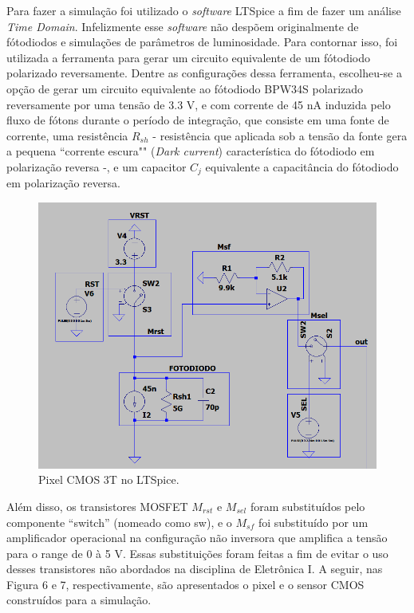 \documentclass[10pt,a4paper,twocolumn]{article}
\begin{document}
	Para fazer a simulação foi utilizado o \textit{software} LTSpice a fim de fazer um análise \textit{Time Domain}. Infelizmente esse \textit{software} não despõem originalmente de fótodiodos e simulações de parâmetros de luminosidade. Para contornar isso, foi utilizada a ferramenta \cite{photodiode} para gerar um circuito equivalente de um fótodiodo polarizado reversamente. Dentre as configurações dessa ferramenta, escolheu-se a opção de gerar um circuito equivalente ao fótodiodo BPW34S \cite{BPW34} polarizado reversamente por uma tensão de 3.3 V, e com corrente de 45 nA induzida pelo fluxo de fótons durante o período de integração, que consiste em uma fonte de corrente, uma resistência $R_{sh}$ - resistência que aplicada sob a tensão da fonte gera a pequena ``corrente escura"" (\textit{Dark current}) característica do fótodiodo em polarização reversa -, e um capacitor $C_{j}$ equivalente a capacitância do fótodiodo em polarização reversa.
	
	\begin{figure}[H]
		\centering
		\includegraphics[scale=0.26]{imagens/pixel_simulado.png}
		\caption{Pixel CMOS 3T no LTSpice.}
	\end{figure}
	
	Além disso, os transistores MOSFET $M_{rst}$ e $M_{sel}$ foram substituídos pelo componente ``switch'' (nomeado como sw), e o $M_{sf}$ foi substituído por um amplificador operacional na configuração não inversora que amplifica a tensão para o range de 0 à 5 V. Essas substituições foram feitas a fim de evitar o uso desses transistores não abordados na disciplina de Eletrônica I. A seguir, nas Figura 6 e 7, respectivamente, são apresentados o pixel e o sensor CMOS construídos para a simulação.
	
\end{document}

